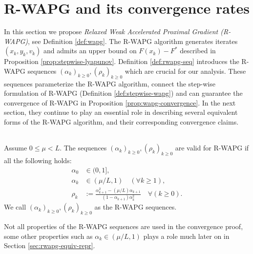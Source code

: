 \documentclass[12pt]{article}
\begin{document}
\section{R-WAPG and its convergence rates}\label{sec:rwapg-formulation-convergence}
    In this section we propose \emph{Relaxed Weak Accelerated Proximal Gradient (R-WAPG)}, see Definition \ref{def:wapg}.
    The R-WAPG algorithm generates iterates $(x_k, y_k, v_k)$ and admits an upper bound on $F(x_k) - F^*$ described in Proposition \ref{prop:stepwise-lyapunov}.
    Definition \ref{def:rwapg-seq} introduces the R-WAPG sequences $(\alpha_k)_{k \ge 0}, (\rho_k)_{k \ge 0}$ which are crucial for our analysis.
    These sequences parameterize the R-WAPG algorithm, connect the step-wise formulation of R-WAPG (Definition \ref{def:stepwise-wapg}) and can guarantee the convergence of R-WAPG in Proposition \ref{prop:wapg-convergence}.
    In the next section, they continue to play an 
    essential role in describing several equivalent forms of the R-WAPG algorithm, and their corresponding convergence claims.
    \begin{definition}\label{def:rwapg-seq}\;\\
        Assume $0 \le \mu < L$.
        The sequences $(\alpha_k)_{k \ge 0}, (\rho_k)_{k \ge 0}$ are valid for R-WAPG if all the following holds:
        \begin{align*}
            \alpha_0 &\in (0, 1],
            \\
            \alpha_k &\in (\mu/L, 1) \quad (\forall k \ge 1),
            \\
            \rho_k &:= \frac{\alpha_{k + 1}^2 - (\mu/L)\alpha_{k + 1}}{(1 - \alpha_{k + 1})\alpha_k^2} \quad \forall (k \ge 0).
        \end{align*}
        We call $(\alpha_k)_{k \ge 0}, (\rho_k)_{k \ge 0}$ as the {R-WAPG sequences}.
    \end{definition}
    Not all properties of the R-WAPG sequences are used in the convergence proof, some other properties such as $\alpha_k \in (\mu/L, 1)$ plays a role much later on in Section \ref{sec:rwapg-equiv-repr}.
\end{document}
